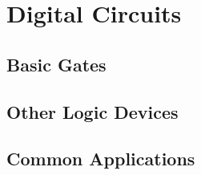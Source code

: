 \chapter{Digital Circuits}
\section{Basic Gates}

\section{Other Logic Devices}

\section{Common Applications}

\newpage